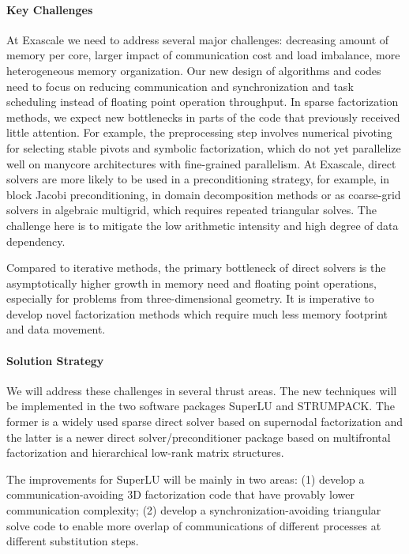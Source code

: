 \paragraph{Key Challenges}
At Exascale we need to address several major challenges:
decreasing amount of memory per core, larger impact of communication
cost and load imbalance, more heterogeneous memory organization.
Our new design of algorithms and codes need to focus on
reducing communication and synchronization and task scheduling 
instead of floating point operation throughput. In sparse factorization
methods, we expect new bottlenecks in parts of the code
that previously received little attention. For example, the preprocessing
step involves numerical pivoting for selecting stable pivots and
symbolic factorization, which do not yet parallelize well on manycore
architectures with fine-grained parallelism.
At Exascale, direct solvers are more likely to
be used in a preconditioning strategy, for example, in block Jacobi
preconditioning, in domain decomposition methods or as coarse-grid
solvers in algebraic multigrid, which requires repeated triangular
solves. The challenge here is to mitigate the low arithmetic intensity
and high degree of data dependency.

Compared to iterative methods, the primary bottleneck of direct solvers
is the asymptotically higher growth in memory need and floating point
operations, especially for problems from three-dimensional geometry.
It is imperative to develop novel factorization methods which require
much less memory footprint and data movement.


\paragraph{Solution Strategy}
We will address these challenges in several thrust areas.
The new techniques will be implemented in the two software packages SuperLU
and STRUMPACK. The former is a widely used sparse direct solver based on
supernodal factorization and the latter is a newer direct
solver/preconditioner package based on multifrontal factorization 
and hierarchical low-rank matrix structures.

The improvements for SuperLU will be mainly in two areas: (1) develop
a communication-avoiding 3D factorization code that have provably 
lower communication complexity; (2) develop a synchronization-avoiding
triangular solve code to enable more overlap of communications of different
processes at different substitution steps.

